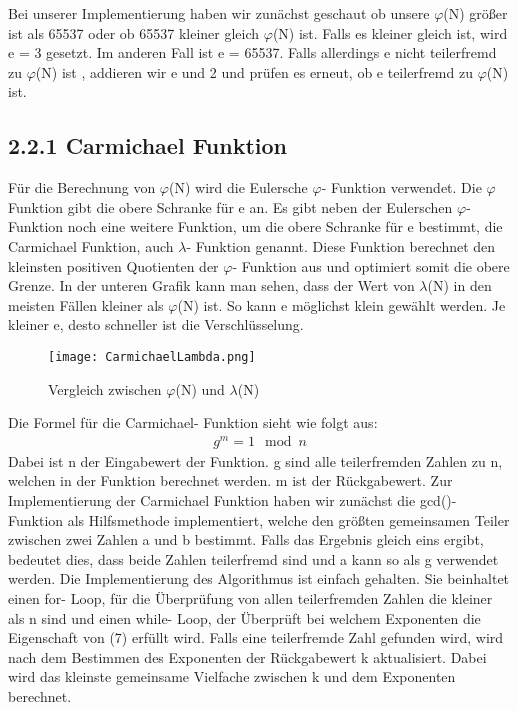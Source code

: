 \documentclass[course=asp]{aspdoc}
\begin{document}
Bei unserer Implementierung haben wir zunächst geschaut ob unsere $\varphi $(N) größer ist als 65537 oder ob 65537 kleiner gleich $\varphi $(N) ist. Falls es kleiner gleich ist, wird e = 3 gesetzt. Im anderen Fall ist e = 65537. Falls allerdings e nicht teilerfremd zu $\varphi $(N) ist , addieren wir e und 2 und prüfen es erneut, ob e teilerfremd zu $\varphi $(N) ist.
\subsection*{2.2.1 Carmichael Funktion} 
Für die Berechnung von $\varphi $(N) wird die Eulersche $\varphi $- Funktion verwendet. Die $\varphi $ Funktion gibt die obere Schranke für e an. Es gibt neben der Eulerschen $\varphi $- Funktion noch eine weitere Funktion, um die obere Schranke für e bestimmt, die Carmichael Funktion, auch $\lambda $- Funktion genannt. Diese Funktion berechnet den kleinsten positiven Quotienten der $\varphi $- Funktion aus und optimiert somit die obere Grenze. In der unteren Grafik kann man sehen, dass der Wert von $\lambda $(N) in den meisten Fällen kleiner als  $\varphi $(N) ist. So kann e möglichst klein gewählt werden. Je kleiner e, desto schneller ist die Verschlüsselung. \cite{Carmicael}
\begin{figure}[h]
\centering
\texttt{[image: CarmichaelLambda.png]}
\caption{Vergleich zwischen $\varphi $(N) und $\lambda $(N)}
\end{figure}

Die Formel für die Carmichael- Funktion sieht wie folgt aus:
\begin{align}
	g^m = 1 \mod n
\end{align} 
Dabei ist n der Eingabewert der Funktion. g sind alle teilerfremden Zahlen zu n, welchen in der Funktion berechnet werden. m ist der Rückgabewert. Zur Implementierung der Carmichael Funktion haben wir zunächst die gcd()- Funktion als Hilfsmethode implementiert, welche den größten gemeinsamen Teiler zwischen zwei Zahlen a und b bestimmt. Falls das Ergebnis gleich eins ergibt, bedeutet dies, dass beide Zahlen teilerfremd sind und a kann so als g verwendet werden. Die Implementierung des Algorithmus ist einfach gehalten. Sie beinhaltet einen for- Loop, für die Überprüfung von allen teilerfremden Zahlen die kleiner als n sind und einen while- Loop, der Überprüft bei welchem Exponenten die Eigenschaft von (7) erfüllt wird. Falls eine teilerfremde Zahl gefunden wird, wird nach dem Bestimmen des Exponenten der Rückgabewert k aktualisiert. Dabei wird das kleinste gemeinsame Vielfache zwischen k und dem Exponenten berechnet. 
\end{document}
